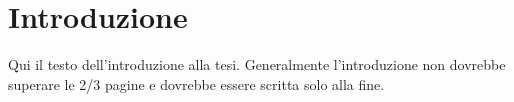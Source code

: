 \chapter{Introduzione}

Qui il testo dell'introduzione alla tesi. Generalmente l'introduzione non dovrebbe superare le 2/3 pagine e dovrebbe essere scritta solo alla fine.